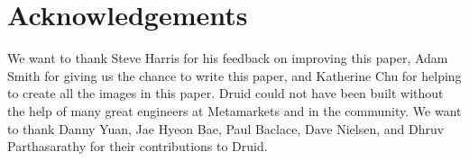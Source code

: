 \documentclass{vldb}
\begin{document}
\balance

\section{Acknowledgements}
\label{sec:acknowledgements}
We want to thank Steve Harris for his feedback on improving this paper, Adam Smith for giving us the chance to write this paper, and Katherine Chu for
helping to create all the images in this paper. Druid could not have been built without the help of many great
engineers at Metamarkets and in the community. We want to thank Danny Yuan, Jae Hyeon Bae, Paul Baclace, Dave
Nielsen, and Dhruv Parthasarathy for their
contributions to Druid.




\end{document}
